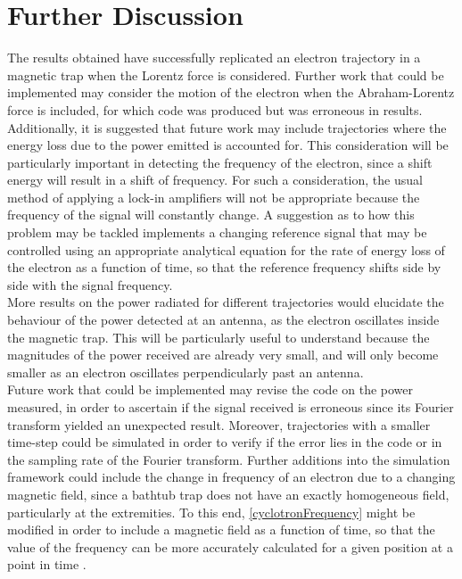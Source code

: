 \documentclass[a4paper,12pt, notitlepage]{article}
\begin{document}
\section{Further Discussion}
The results obtained have successfully replicated an electron trajectory in a magnetic trap when the Lorentz force is considered. Further work that could be implemented may consider the motion of the electron when the Abraham-Lorentz force is included, for which code was produced but was erroneous in results. Additionally, it is suggested that future work may include trajectories where the energy loss due to the power emitted is accounted for. This consideration will be particularly important in detecting the frequency of the electron, since a shift energy will result in a shift of frequency. For such a consideration, the usual method of applying a lock-in amplifiers will not be appropriate because the frequency of the signal will constantly change. A suggestion as to how this problem may be tackled implements a changing reference signal that may be controlled using an appropriate analytical equation for the rate of energy loss of the electron as a function of time, so that the reference frequency shifts side by side with the signal frequency. \\
More results on the power radiated for different trajectories would elucidate the behaviour of the power detected at an antenna, as the electron oscillates inside the magnetic trap. This will be particularly useful to understand because the magnitudes of the power received are already very small, and will only become smaller as an electron oscillates perpendicularly past an antenna. \\
Future work that could be implemented may revise the code on the power measured, in order to ascertain if the signal received is erroneous since its Fourier transform yielded an unexpected result. Moreover, trajectories with a smaller time-step could be simulated in order to verify if the error lies in the code or in the sampling rate of the Fourier transform.
Further additions into the simulation framework could include the change in frequency of an electron due to a changing magnetic field, since a bathtub trap does not have an exactly homogeneous field, particularly at the extremities. To this end, \cref{cyclotronFrequency} might be modified in order to include a magnetic field as a function of time, so that the value of the frequency can be more accurately calculated for a given position at a point in time \cite{Ashtari2019}. \\
\printbibliography
\end{document}
